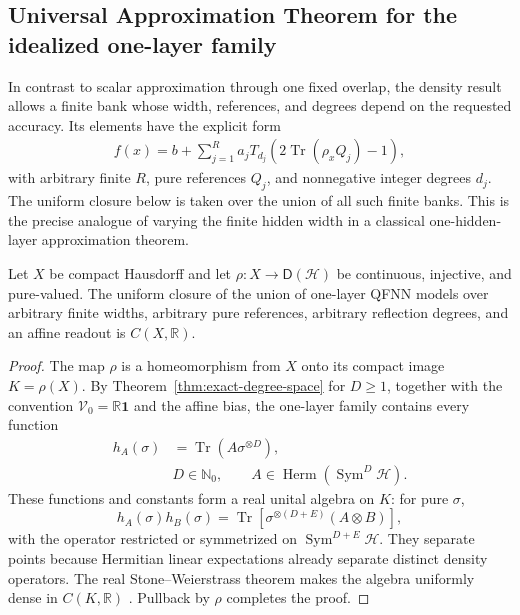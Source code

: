 \documentclass[pdflatex,sn-mathphys,NameDate,iicol]{sn-jnl}
\newcommand{\Tr}{\operatorname{Tr}}
\newcommand{\R}{\mathbb{R}}
\newcommand{\N}{\mathbb{N}}
\newcommand{\Herm}{\operatorname{Herm}}
\newcommand{\Dens}{\mathsf{D}}
\newcommand{\Sym}{\operatorname{Sym}}
\newcommand{\cH}{\mathcal{H}}
\newcommand{\cV}{\mathcal{V}}
\begin{document}
\subsection{Universal Approximation Theorem for the idealized one-layer family}

In contrast to scalar approximation through one fixed overlap, the density
result allows a finite bank whose width, references, and degrees depend on
the requested accuracy. Its elements have the explicit form
\begin{equation}
  \begin{aligned}
  f(x)=b+\sum_{j=1}^{R}a_j
  T_{d_j}\!\left(
  2\Tr(\rho_xQ_j)-1
  \right),
  \end{aligned}
  \label{eq:finite-width-bank}
\end{equation}
with arbitrary finite $R$, pure references $Q_j$, and nonnegative integer
degrees $d_j$. The uniform closure below is taken over the union of all such
finite banks. This is the precise analogue of varying the finite hidden
width in a classical one-hidden-layer approximation theorem.

\begin{theorem}
\label{thm:pure-density}
Let $X$ be compact Hausdorff and let
$\rho:X\to\Dens(\cH)$ be continuous, injective, and pure-valued. The uniform
closure of the union of one-layer QFNN models over arbitrary finite widths,
arbitrary pure references, arbitrary reflection degrees, and an affine
readout is $C(X,\R)$.
\end{theorem}

\begin{proof}
The map $\rho$ is a homeomorphism from $X$ onto its compact image
$K=\rho(X)$. By Theorem~\ref{thm:exact-degree-space} for $D\ge1$, together
with the convention $\cV_0=\R\mathbf1$ and the affine bias, the one-layer
family contains every function
\begin{equation}
  \begin{aligned}
  h_A(\sigma)&=\Tr(A\sigma^{\otimes D}),\\[-1mm]
  &D\in\N_0,\qquad
  A\in\Herm(\Sym^D\cH).
  \end{aligned}
  \label{eq:pure-polynomial-function}
\end{equation}
These functions and constants form a real unital algebra on $K$: for pure
$\sigma$,
\begin{equation}
  h_A(\sigma)h_B(\sigma)
  =
  \Tr\!\left[
    \sigma^{\otimes(D+E)}(A\otimes B)
  \right],
\end{equation}
with the operator restricted or symmetrized on
$\Sym^{D+E}\cH$. They separate points because Hermitian linear
expectations already separate distinct density operators. The real
Stone--Weierstrass theorem makes the algebra uniformly dense in
$C(K,\R)$ \citep{stone1948weierstrass}. Pullback by $\rho$ completes the
proof.
\end{proof}
\end{document}
